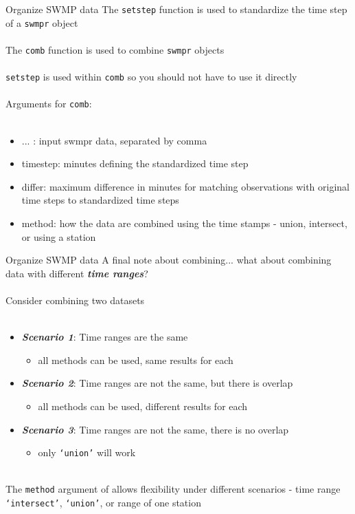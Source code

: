\documentclass[xcolor=dvipsnames,serif]{beamer}\usepackage[]{graphicx}\usepackage[]{color}
\newcommand{\Bigtxt}[1]{\textbf{\textit{#1}}}
\begin{document}
\begin{frame}[fragile]{Organize SWMP data}
The \texttt{setstep} function is used to standardize the time step of a \texttt{swmpr} object \\~\\
The \texttt{comb} function is used to combine \texttt{swmpr} objects \\~\\
\texttt{setstep} is used within \texttt{comb} so you should not have to use it directly \\~\\
Arguments for \texttt{comb}: \\~\\
\begin{itemize}
\item ... : input swmpr data, separated by comma
\item timestep: minutes defining the standardized time step
\item differ: maximum difference in minutes for matching observations with original time steps to standardized time steps
\item method: how the data are combined using the time stamps - union, intersect, or using a station
\end{itemize}
\end{frame}

\begin{frame}[fragile]{Organize SWMP data}
A final note about combining... what about combining data with different \Bigtxt{time ranges}?\\~\\
Consider combining two datasets \\~\\
\begin{itemize}
\item {} \Bigtxt{Scenario 1}: Time ranges are the same
\begin{itemize}
\item {} all methods can be used, same results for each
\end{itemize}
\item {} \Bigtxt{Scenario 2}: Time ranges are not the same, but there is overlap
\begin{itemize}
\item {} all methods can be used, different results for each
\end{itemize}
\item {} \Bigtxt{Scenario 3}: Time ranges are not the same, there is no overlap
\begin{itemize}
\item {} only \texttt{`union'} will work \\~\\
\end{itemize}
\end{itemize}
The \texttt{method} argument of allows flexibility under different scenarios - time range \texttt{`intersect'}, \texttt{`union'}, or range of one station
\end{frame}
\end{document}
